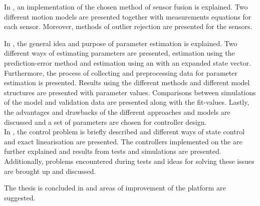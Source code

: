 In , an implementation of the chosen method of sensor fusion is explained. Two different motion models are presented together with measurements equations for each \abbrROV sensor. Moreover, methods of outlier rejection are presented for the sensors.

In , the general idea and purpose of parameter estimation is explained. Two different ways of estimating parameters are presented, estimation using the prediction-error method and estimation using an \abbrEKF with an expanded state vector. Furthermore, the process of collecting and preprocessing data for parameter estimation is presented. Results using the different methods and different model structures are presented with parameter values. Comparisons between simulations of the model and validation data are presented along with the fit-values. Lastly, the advantages and drawbacks of the different approaches and models are discussed and a set of parameters are chosen for controller design.\\

In , the control problem is briefly described and different ways of state control and exact linearisation are presented. The controllers implemented on the \abbrROV are further explained and results from tests and simulations are presented. Additionally, problems encountered during tests and ideas for solving these issues are brought up and discussed.

The thesis is concluded in  and areas of improvement of the \abbrROV platform are suggested. 

